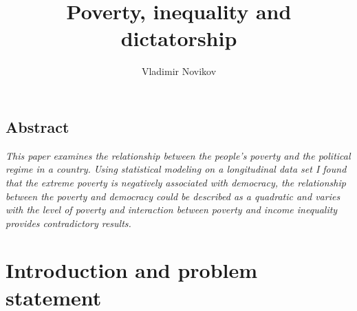 \documentclass[a4paper, 12pt]{article}
\title{Poverty, inequality and dictatorship}
\author{Vladimir Novikov}
\begin{document}
\maketitle

\begin{center}
    \subsection*{Abstract}

    \textit{This paper examines the relationship between the people's poverty and the political regime in a country. Using statistical modeling on a longitudinal data set I found that the extreme poverty is negatively associated with democracy, the relationship between the poverty and democracy could be described as a quadratic and varies with the level of poverty and interaction between poverty and income inequality provides contradictory results.}
    
\end{center}

\section{Introduction and problem statement}
\end{document}
